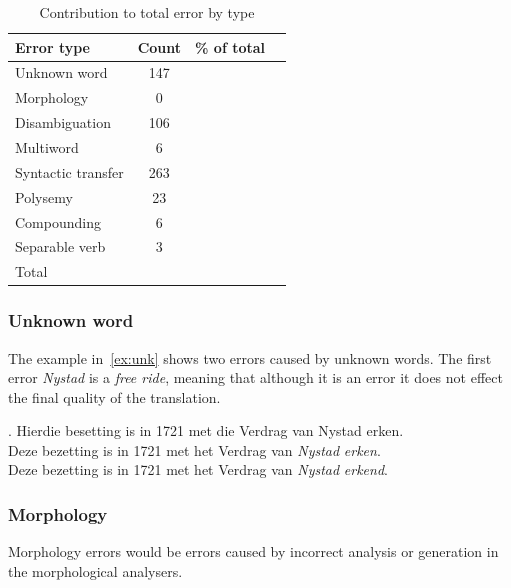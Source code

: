 \documentclass[11pt]{article}
\begin{document}
\begin{table}
  \begin{center}
  \begin{tabular}{|l|c|r|r|}
     \hline
     {\bf Error type}    & {\bf Count} & {\bf \% of total} \\
     \hline
     Unknown word        & 147         & \\
     Morphology          & 0           & \\
     Disambiguation      & 106         & \\
     Multiword           & 6           & \\
     Syntactic transfer  & 263         & \\
     Polysemy            & 23          & \\
     Compounding         & 6           & \\
     Separable verb      & 3           & \\
     \hline
     Total               &             & \\
     \hline
  \end{tabular}
    \caption{Contribution to total error by type}
    \label{table:qual}
  \end{center}
\end{table}

\subsubsection{Unknown word}

The example in~\ref{ex:unk} shows two errors caused by unknown words. The first error {\em Nystad} 
is a {\em free ride}, meaning that although it is an error it does not effect the final quality
of the translation. 

\ex. \label{ex:unk} 
    Hierdie besetting is in 1721 met die Verdrag van Nystad erken. \\
    Deze bezetting is in 1721 met het Verdrag van {\em *Nystad} {\em *erken}. \\
    Deze bezetting is in 1721 met het Verdrag van {\em Nystad} {\em erkend}. \\

\subsubsection{Morphology}

Morphology errors would be errors caused by incorrect analysis or generation in the morphological analysers.
\end{document}
